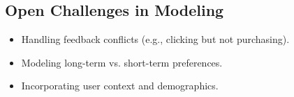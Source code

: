 \subsection{Open Challenges in Modeling}

\begin{itemize}
    \item Handling feedback conflicts (e.g., clicking but not purchasing).
    \item Modeling long-term vs. short-term preferences.
    \item Incorporating user context and demographics.
\end{itemize}
